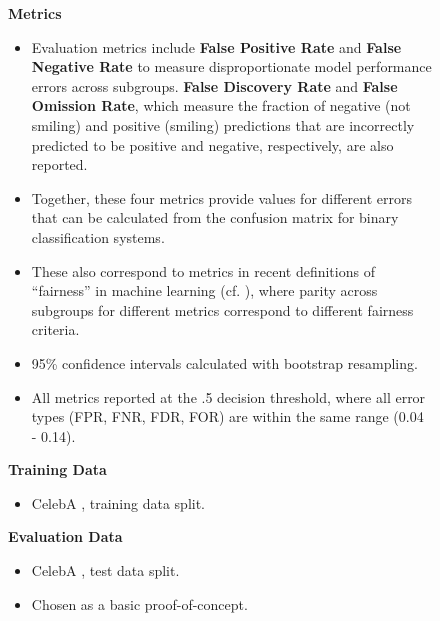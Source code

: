 \begin{figure}
\begin{framed}
\begin{minipage}{.615\textwidth}
\vspace{.25em}
{\bf Metrics}
\begin{itemize}[leftmargin=*]
\item Evaluation metrics include {\bf False Positive Rate} and {\bf False Negative Rate} to measure disproportionate model performance errors across subgroups. {\bf False Discovery Rate} and {\bf False Omission Rate}, which measure the fraction of negative (not smiling) and positive (smiling) predictions that are incorrectly predicted to be positive and negative, respectively, are also reported. \cite{verma2018fairness}  
\item Together, these four metrics provide values for different errors that can be calculated from the confusion matrix for binary classification systems.
\item These also correspond to metrics in recent definitions of ``fairness'' in machine learning (cf. \cite{HardtEtAl2016,chouldechova2017fair}), where parity across subgroups for different metrics correspond to different fairness criteria.
\item 95\% confidence intervals calculated with bootstrap resampling.  
\item All metrics reported at the .5 decision threshold, where all error types (FPR, FNR, FDR, FOR) are within the same range (0.04 - 0.14). 
\end{itemize}
\vspace{.3em}
\begin{minipage}{0.4\textwidth}
{\bf Training Data}
\begin{itemize}[leftmargin=*]
\item CelebA \cite{LiuEtAl2015}, training data split. 
\end{itemize}
\vspace{1em}
\end{minipage}
\hspace{2em}
\begin{minipage}{0.5\textwidth}
    {\bf Evaluation Data}
\begin{itemize}[leftmargin=*]
\item CelebA \cite{LiuEtAl2015}, test data split.
\item Chosen as a basic proof-of-concept.
\end{itemize}
\end{minipage}


\end{minipage}
\end{framed}
\end{figure}
